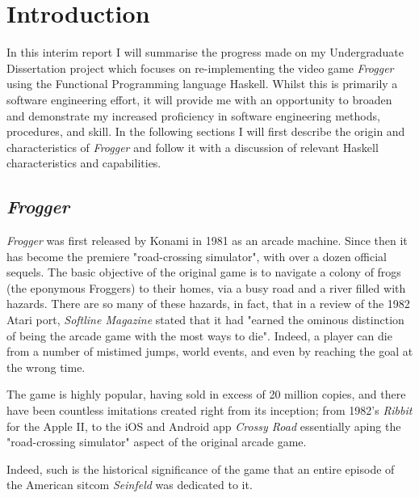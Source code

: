 \documentclass[12pt, a4paper]{report}
\begin{document}
\maketitle

\tableofcontents
\pagebreak

\section{Introduction}
In this interim report I will summarise the progress made on my Undergraduate Dissertation project which focuses on re-implementing the video game \textit{Frogger} using the Functional Programming language Haskell.
Whilst this is primarily a software engineering effort, it will provide me with an opportunity to broaden and demonstrate my increased proficiency in software engineering methods, procedures, and skill.
In the following sections I will first describe the origin and characteristics of \textit{Frogger} and follow it with a discussion of relevant Haskell characteristics and capabilities.

\subsection{\textit{Frogger}}
\textit{Frogger} was first released by Konami in 1981 as an arcade machine.
Since then it has become the premiere "road-crossing simulator", with over a dozen official sequels.
The basic objective of the original game is to navigate a colony of frogs (the eponymous Froggers) to their homes, via a busy road and a river filled with hazards.
There are so many of these hazards, in fact, that in a review of the 1982 Atari port, \textit{Softline Magazine} stated that it had "earned the ominous distinction of being the arcade game with the most ways to die"\cite{softline}. Indeed, a player can die from a number of mistimed jumps, world events, and even by reaching the goal at the wrong time.

\par

The game is highly popular, having sold in excess of 20 million copies\cite{konamipressrelease}, and there have been countless imitations created right from its inception; from 1982's \textit{Ribbit} for the Apple II, to the iOS and Android app \textit{Crossy Road} essentially aping the "road-crossing simulator" aspect of the original arcade game.

Indeed, such is the historical significance of the game that an entire episode of the American sitcom \textit{Seinfeld} was dedicated to it\cite{seinfeld}.
\end{document}
